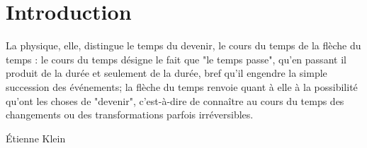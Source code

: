 \chapter*{Introduction}

\epigraph{La physique, elle, distingue le temps du devenir, le cours du temps de la flèche du temps : le cours du temps désigne le fait que "le temps passe", qu'en passant il produit de la durée et seulement de la durée, bref qu'il engendre la simple succession des événements; la flèche du temps renvoie quant à elle à la possibilité qu'ont les choses de "devenir", c'est-à-dire de connaître au cours du temps des changements ou des transformations parfois irréversibles.}{Étienne Klein}

\blindtext[2]

\blindtext